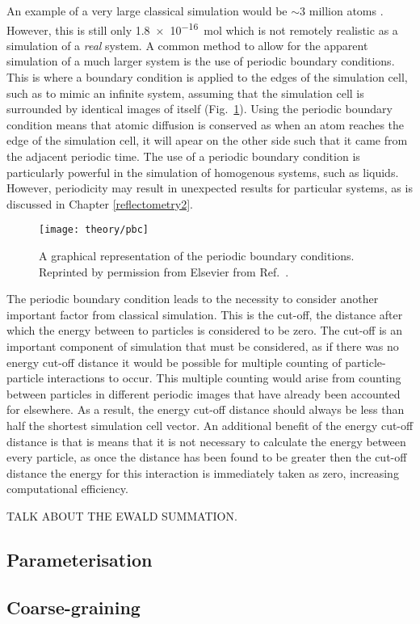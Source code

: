 An example of a very large classical simulation would be $\sim3$ million atoms \cite{Gumbart2009}.
However, this is still only \SI{1.8e-16}{\mol} which is not remotely realistic as a simulation of a \emph{real} system.
A common method to allow for the apparent simulation of a much larger system is the use of periodic boundary conditions.
This is where a boundary condition is applied to the edges of the simulation cell, such as to mimic an infinite system, assuming that the simulation cell is surrounded by identical images of itself (Fig.~\ref{fig:pbc}).
Using the periodic boundary condition means that atomic diffusion is conserved as when an atom reaches the edge of the simulation cell, it will apear on the other side such that it came from the adjacent periodic time.
The use of a periodic boundary condition is particularly powerful in the simulation of homogenous systems, such as liquids.
However, periodicity may result in unexpected results for particular systems, as is discussed in Chapter \ref{reflectometry2}.
%
\begin{figure}
	\centering
	\texttt{[image: theory/pbc]}
	\caption{A graphical representation of the periodic boundary conditions. Reprinted by permission from Elsevier\textsuperscript{\textcopyright} from Ref.~\cite{Frenkel1996}.}
	\label{fig:pbc}
\end{figure}
%

The periodic boundary condition leads to the necessity to consider another important factor from classical simulation.
This is the cut-off, the distance after which the energy between to particles is considered to be zero.
The cut-off is an important component of simulation that must be considered, as if there was no energy cut-off distance it would be possible for multiple counting of particle-particle interactions to occur.
This multiple counting would arise from counting between particles in different periodic images that have already been accounted for elsewhere.
As a result, the energy cut-off distance should always be less than half the shortest simulation cell vector.
An additional benefit of the energy cut-off distance is that is means that it is not necessary to calculate the energy between every particle, as once the distance has been found to be greater then the cut-off distance the energy for this interaction is immediately taken as zero, increasing computational efficiency.

TALK ABOUT THE EWALD SUMMATION.




\subsection{Parameterisation}
\label{sec:parameterisation}
\subsection{Coarse-graining}
